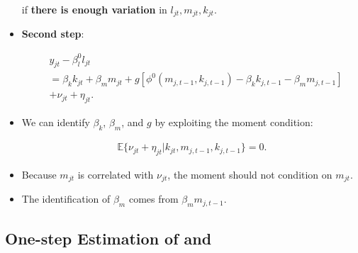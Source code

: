 \documentclass[]{book}
\theoremstyle{definition}
\theoremstyle{definition}
\theoremstyle{definition}
\theoremstyle{remark}
\begin{document}
\begin{itemize}
  if \textbf{there is enough variation} in \(l_{jt}, m_{jt}, k_{jt}\).
\item
  \textbf{Second step}:

  \begin{equation}
  \begin{split}
  &y_{jt} - \beta_l^0 l_{jt}\\
  & = \beta_k k_{jt} + \beta_m m_{jt} + g[\phi^0(m_{j, t - 1}, k_{j, t - 1}) - \beta_k k_{j, t - 1} - \beta_m m_{j, t - 1}]\\
  & + \nu_{jt} + \eta_{jt}.
  \end{split}
  \end{equation}
\item
  We can identify \(\beta_k\), \(\beta_m\), and \(g\) by exploiting the
  moment condition:

  \begin{equation}
  \begin{split}
  \mathbb{E}\{\nu_{jt} + \eta_{jt} | k_{jt}, m_{j, t - 1}, k_{j,t - 1}\} = 0.
  \end{split}
  \end{equation}
\item
  Because \(m_{jt}\) is correlated with \(\nu_{jt}\), the moment should
  not condition on \(m_{jt}\).
\item
  The identification of \(\beta_{m}\) comes from
  \(\beta_m m_{j, t - 1}\).
\end{itemize}

\subsection{\texorpdfstring{One-step Estimation of \citet{Olley1996} and
\citet{Levinsohn2003}}{One-step Estimation of @Olley1996 and @Levinsohn2003}}\label{one-step-estimation-of-olley1996-and-levinsohn2003}
\end{document}
